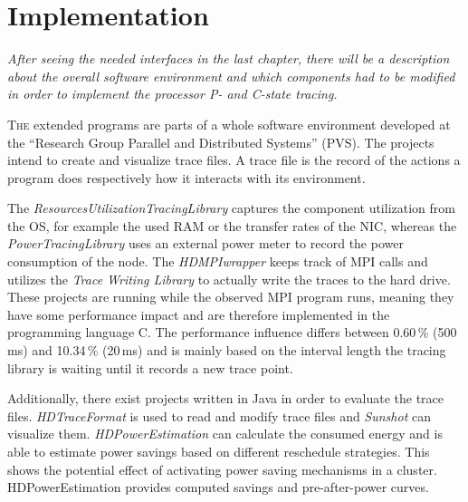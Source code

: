 \renewcommand*{\dictumwidth}{0.5\textwidth}
\chapter{Implementation}
\label{chap:implementation}
\bigskip
\textit{After seeing the needed interfaces in the last chapter, there will be a description about the overall software environment and which components had to be modified in order to implement the processor P- and C-state tracing.}

\bigskip
\lettrine[lines=2, lhang=.1, lraise=.1]{T}{he} extended programs are parts of a whole software environment developed at the ``Research Group Parallel and Distributed Systems'' (PVS). The projects intend to create and visualize trace files. A trace file is the record of the actions a program does respectively how it interacts with its environment.

The \emph{ResourcesUtilizationTracingLibrary} captures the component utilization from the OS, for example the used RAM or the transfer rates of the NIC, whereas the \emph{PowerTracingLibrary} uses an external power meter to record the power consumption of the node. The \emph{HDMPIwrapper} keeps track of MPI calls and utilizes the \emph{Trace Writing Library} to actually write the traces to the hard drive. These projects are running while the observed MPI program runs, meaning they have some performance impact and are therefore implemented in the programming language C. The performance influence differs between 0.60\,\% (500\,ms) and 10.34\,\% (20\,ms)\cite{krempel} and is mainly based on the interval length the tracing library is waiting until it records a new trace point.

Additionally, there exist projects written in Java in order to evaluate the trace files. \emph{HDTraceFormat} is used to read and modify trace files and \emph{Sunshot} can visualize them. \emph{HDPowerEstimation} can calculate the consumed energy and is able to estimate power savings based on different reschedule strategies. This shows the potential effect of activating power saving mechanisms in a cluster. HDPowerEstimation provides computed savings and pre-after-power curves.

